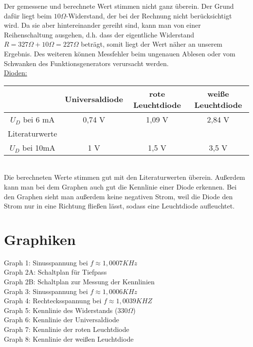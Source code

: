 \documentclass[paper=a4, fontsize=11pt]{scrartcl}
\numberwithin{equation}{section}
\numberwithin{figure}{section}
\numberwithin{table}{section}
\begin{document}
Der gemessene und berechnete Wert stimmen nicht ganz überein. Der Grund dafür liegt beim  $10 \Omega$-Widerstand, der bei der Rechnung nicht berücksichtigt wird. Da sie aber hintereinander gereiht sind, kann man von einer Reihenschaltung ausgehen, d.h. dass der eigentliche Widerstand $R=327 \Omega +10 \Omega = 227 \Omega$ beträgt, somit liegt der Wert näher an unserem Ergebnis. Des weiteren können Messfehler beim ungenauen Ablesen oder vom Schwanken des Funktionsgenerators verursacht werden. \\

\underline{Dioden:} \\

\begin{tabular}{|c|c|c|c|}
\hline
& Universaldiode & rote Leuchtdiode & weiße Leuchtdiode \\
\hline
$U_{D}$ bei 6 mA & 0,74 V& 1,09 V & 2,84 V \\
\hline
Literaturwerte & & & \\
$U_{D}$ bei 10mA & 1 V & 1,5 V & 3,5 V \\
\hline
\end{tabular} \\

Die berechneten Werte stimmen gut mit den Literaturwerten überein. Außerdem kann man bei dem Graphen auch gut die Kennlinie einer Diode erkennen.
Bei den Graphen sieht man außerdem keine negativen Strom, weil die Diode den Strom nur in eine Richtung fließen lässt, sodass eine Leuchtdiode aufleuchtet. 


\newpage

\section{Graphiken}

Graph 1: Sinusspannung bei $f \approx 1,0007 KHz$ \\
Graph 2A: Schaltplan für Tiefpass \\
Graph 2B: Schaltplan zur Messung der Kennlinien \\
Graph 3: Sinusspannung bei $f \approx 1,0006 KHz$ \\
Graph 4: Rechtecksspannung bei $f \approx 1,0039 KHZ$ \\
Graph 5: Kennlinie des Widerstands ($330 \Omega$) \\
Graph 6: Kennlinie der Universaldiode \\
Graph 7: Kennlinie der roten Leuchtdiode \\
Graph 8: Kennlinie der weißen Leuchtdiode \\
\end{document}
